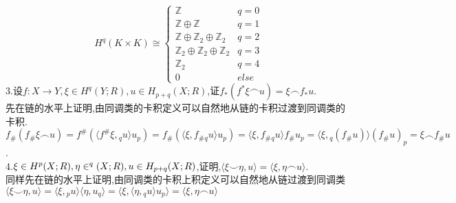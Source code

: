 \documentclass[b5paper]{ctexart}
\begin{document}
\[H^q(K\times K)\cong\left\lbrace \begin{array}{ll}
\mathbb{Z} & q=0\\
\mathbb{Z}\oplus\mathbb{Z} & q=1\\
\mathbb{Z}\oplus\mathbb{Z}_2\oplus\mathbb{Z}_2 & q=2\\
\mathbb{Z}_2\oplus\mathbb{Z}_2\oplus\mathbb{Z}_2 & q=3\\
\mathbb{Z}_2& q=4\\
0 & else
\end{array}\right. 
\]
3.设$f:X\to Y,\xi \in H^q(Y;R),u\in H_{p+q}(X;R)$,证$f_*(f^*\xi\frown u)=\xi\frown f_*u.$\\
先在链的水平上证明,由同调类的卡积定义可以自然地从链的卡积过渡到同调类的卡积.\\
$f_{\#}(f_{\#}\xi\frown u)=f^{\#}(\langle f^{\#}\xi,{}_qu\rangle u_p)=f_{\#}(\langle \xi,f_{\#}{}_qu\rangle u_p)=\langle \xi,f_{\#}{}_qu\rangle f_{\#}u_p=\langle \xi,{}_q(f_{\#}u)\rangle (f_{\#}u)_p=\xi\frown f_{\#}u$.\\
4.$\xi\in H^p(X;R),\eta\in\Huge^q(X;R),u\in H_{p+q}(X;R)$,证明,$\langle \xi\smile \eta,u\rangle=\langle \xi,\eta\frown u\rangle.$\\
同样先在链的水平上证明,由同调类的卡积上积定义可以自然地从链过渡到同调类
$\langle \xi\smile \eta,u\rangle=\langle\xi,{}_pu\rangle\langle\eta,u_q\rangle=\langle\xi,\langle \eta,{}_qu\rangle u_p\rangle=\langle\xi,\eta\frown u\rangle$
\end{document}
